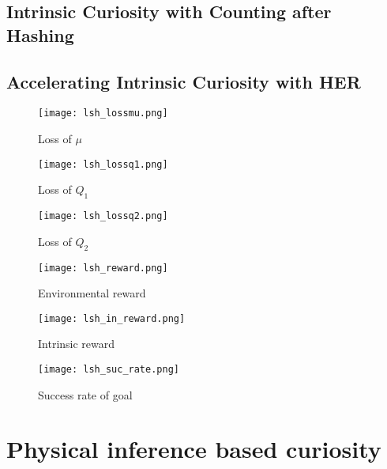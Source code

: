 \documentclass[a4paper, 12pt]{report}
\begin{document}
    \section{Intrinsic Curiosity with Counting after Hashing}

    \section{Accelerating Intrinsic Curiosity with HER}
        \begin{figure}[H]
        \centering
        \texttt{[image: lsh\_lossmu.png]}
        \caption{Loss of $\mu$}
        \end{figure}

        \begin{figure}[H]
        \centering
        \texttt{[image: lsh\_lossq1.png]}
        \caption{Loss of $Q_1$}
        \end{figure}

        \begin{figure}[H]
        \centering
        \texttt{[image: lsh\_lossq2.png]}
        \caption{Loss of $Q_2$}
        \end{figure}

        \begin{figure}[H]
        \centering
        \texttt{[image: lsh\_reward.png]}
        \caption{Environmental reward}
        \end{figure}

        \begin{figure}[H]
        \centering
        \texttt{[image: lsh\_in\_reward.png]}
        \caption{Intrinsic reward}
        \end{figure}

        \begin{figure}[H]
        \centering
        \texttt{[image: lsh\_suc\_rate.png]}
        \caption{Success rate of goal}
        \end{figure}

\chapter {Physical inference based curiosity}


{}

\end{document}
